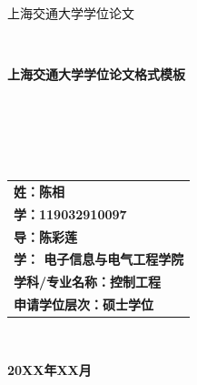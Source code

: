\documentclass[UTF8,a4paper,12pt]{ctexart}
\numberwithin{equation}{section}
\begin{document}
\thispagestyle{empty}

\renewcommand{\headrulewidth}{0pt}
\begin{figure}[htb] 
 \end{figure}

\begin{center}
\songti {} 上海交通大学学位论文
\end{center}
~\\
\begin{center}
\songti {} \textbf{上海交通大学学位论文格式模板}
\end{center}
~\\
~\\
~\\
~\\
\begin{center}
\heiti {}
\begin{tabular}{l}
\textbf{姓：陈相}\\
\textbf{学：119032910097}\\
\textbf{导：陈彩莲}\\
\textbf{学： 电子信息与电气工程学院}\\
\textbf{学科/专业名称：控制工程}\\
\textbf{申请学位层次：硕士学位}\\
\end{tabular}
\end{center}
~\\
\begin{center}
\songti {} \textbf{20XX年XX月}
\end{center}
\end{document}
